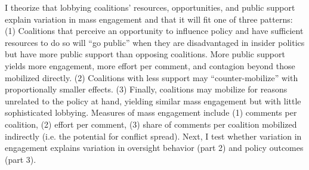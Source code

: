 I theorize that lobbying coalitions' resources, opportunities, and public support explain variation in mass engagement %
and that it will fit one of three patterns:
(1) Coalitions that perceive an opportunity to influence policy and have sufficient resources to do so will ``go public'' when they are disadvantaged in insider politics but have more public support than opposing coalitions. More public support yields more engagement, more effort per comment, and contagion beyond those mobilized directly. (2) Coalitions with less support may ``counter-mobilize'' with proportionally smaller effects. (3) Finally, coalitions may mobilize for reasons unrelated to the policy at hand, yielding similar mass engagement but with little sophisticated lobbying. 
Measures of mass engagement include 
(1) comments per coalition, %
(2) effort per comment, %
(3) share of comments per coalition mobilized indirectly (i.e. the potential for conflict spread).
Next, I test whether variation in engagement explains variation in oversight behavior (part 2) and policy outcomes (part 3).

